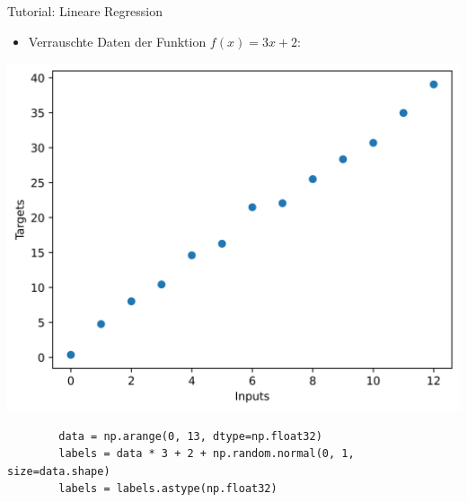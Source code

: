 \documentclass[utf8, smaller, c]{beamer}
\begin{document}
\begin{frame}{Tutorial: Lineare Regression}
    
    \begin{minipage}{0.38\textwidth}
	   \begin{itemize}
		    \item Verrauschte Daten der Funktion $f(x)=3x+2$:
	    \end{itemize}
    \end{minipage}
    \begin{minipage}{0.6\textwidth}
        \centering
	    \includegraphics[scale=0.38]{pics/lin_regression_data.png}
	\end{minipage}
	\begin{lstlisting}
	    data = np.arange(0, 13, dtype=np.float32)
        labels = data * 3 + 2 + np.random.normal(0, 1, size=data.shape)
        labels = labels.astype(np.float32)
	\end{lstlisting}
	
	\framebreak
	

\end{frame}
\end{document}
